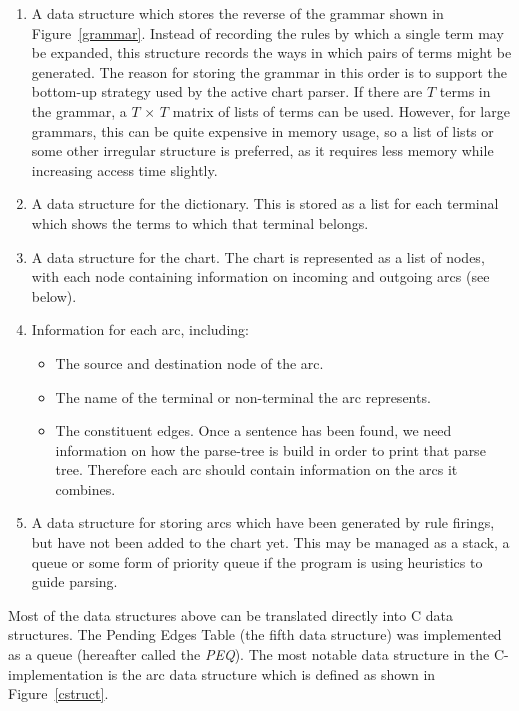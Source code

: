 \begin{enumerate}

\item
A data structure which stores the reverse of the grammar shown in
Figure~\ref{grammar}. Instead of recording the rules by which a single
term may be expanded, this structure records the ways in which pairs
of terms might be generated. The reason for storing the grammar in
this order is to support the bottom-up strategy used by the active
chart parser. If there are $T$ terms in the grammar, a $T$ $\times$
$T$ matrix of lists of terms can be used. However, for large grammars,
this can be quite expensive in memory usage, so a list of lists or some
other irregular  structure is preferred, as it requires less memory
while increasing access time slightly.

\item
A data structure for the dictionary. This is stored as a list for each
terminal which shows the terms to which that terminal belongs.

\item
A data structure for the chart. The chart is represented as a list of
nodes, with each node containing information on incoming and outgoing
arcs (see below).

\item
Information for each arc, including:

	\begin {itemize}
	
	\item	The source and destination node of the arc.
	\item	The name of the terminal or non-terminal the arc
		represents.
	\item	The constituent edges. Once a sentence has been found,
		we need information on how the parse-tree is build in
		order to print that parse tree. Therefore each arc should contain
		information on the arcs it combines. 
	\end {itemize}

\item
A data structure for storing arcs which have
been generated by rule firings, but have not been added to the chart
yet. This may be managed as a stack, a queue or some form of priority
queue if the program is using heuristics to guide parsing.

\end {enumerate}

Most of the data structures above can be translated directly into C
data structures. The Pending Edges Table (the fifth data structure)
was implemented as a queue 
(hereafter called the {\em PEQ}).
The most notable data structure  in the C-implementation is the arc
data structure which is defined as shown in Figure~\ref{cstruct}.

